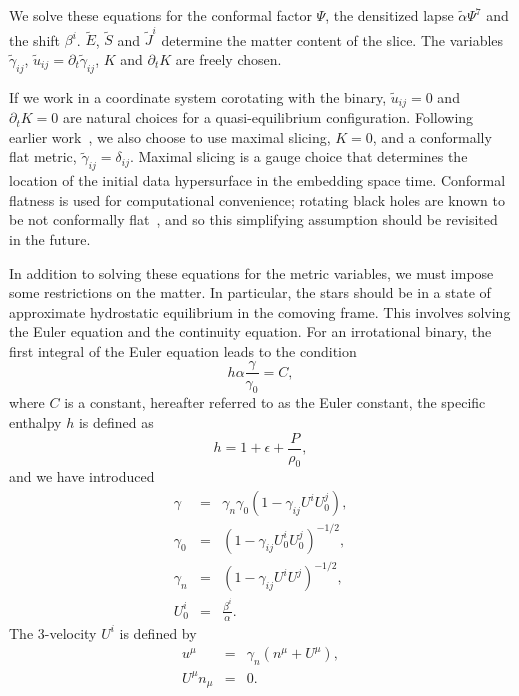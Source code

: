 We solve these equations for the conformal factor $\Psi$, the
densitized lapse $\tilde\alpha\Psi^7$ and the shift $\beta^i$. $\tilde{E}$,
$\tilde{S}$ and $\tilde{J}^i$ determine the matter content of the
slice. The variables $\tilde{\gamma}_{ij}$, $\tilde{u}_{ij} =
\partial_t\tilde{\gamma}_{ij}$, $K$ and $\partial_t K$ are freely
chosen.

  If we work in a coordinate system corotating with the binary,
  $\tilde{u}_{ij} = 0$ and $\partial_t K = 0$ are natural choices for
  a quasi-equilibrium configuration. Following earlier work~\citep{Taniguchi2007,TaniguchiEtAl:2006,FoucartEtAl:2008}, we also choose to
  use maximal slicing, $K=0$, and a conformally flat metric,
  $\tilde{\gamma}_{ij}=\delta_{ij}$. 
  Maximal slicing is a gauge choice that determines the
    location of the initial data hypersurface in the embedding space
    time. Conformal flatness is used for computational convenience;
    rotating black holes are known to be not conformally
    flat~\citep{GaratPrice:2000}, and so this simplifying assumption should be revisited in the future.

In addition to solving these equations for the metric variables, we
must impose some restrictions on the matter. In particular, the stars
should be in a state of approximate hydrostatic equilibrium in the comoving
frame. 
This involves solving the Euler equation and the continuity
equation. For an irrotational binary, the first integral of the Euler
equation leads to the condition
\begin{equation}
h\alpha\frac{\gamma}{\gamma_0} = C,
\label{eq:Euler0}
\end{equation}
where $C$ is a constant, hereafter referred to as the Euler constant, the specific enthalpy $h$ is defined as
\begin{equation}
h = 1+\epsilon + \frac{P}{\rho_0},
\end{equation}
and we have introduced
\begin{eqnarray}
\gamma &=& \gamma_n\gamma_0\left(1 -
\gamma_{ij}U^iU^j_0\right),\\ \gamma_0 &=& \left(1 -
\gamma_{ij}U^i_0U^j_0\right)^{-1/2},\\ \gamma_n &=& \left(1 -
\gamma_{ij}U^iU^j\right)^{-1/2},\\ U^i_0 &=& \frac{\beta^{i}}{\alpha}.
\end{eqnarray}
The 3-velocity $U^i$ is defined by
\begin{eqnarray}
u^{\mu} &=& \gamma_n (n^\mu + U^\mu),\\ U^\mu n_\mu &=& 0.
\end{eqnarray}

